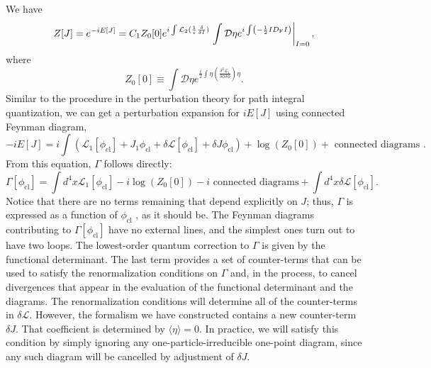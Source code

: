We have
\[Z[J] = e^{-iE[J]} =C_1 Z_0[0] e^{i\int \mathcal{L}_2(\frac{1}{i} \frac{\delta}{\delta I})} \left. \int \mathcal{D}\eta e^{i\int \left(-\frac{1}{2} I D_{\rm F} I \right)} \right|_{I=0},\]
where
\[Z_0[0] \equiv \int \mathcal{D}\eta e^{ \frac{i}{2}\int \eta \left( \frac{\delta^2 \mathcal{L}_1}{\delta \phi \delta \phi}\right) \eta }.\]
Similar to the procedure in the perturbation theory for path integral quantization, we can get a perturbation expansion for $iE[J]$ using connected Feynman diagram,
\[-iE[J] = i \int ( \mathcal{L}_1 [\phi_{\mathrm{cl}}] + J_1\phi_{\mathrm{cl}} + \delta \mathcal{L}[\phi_{\mathrm{cl}}] + \delta J \phi_{\mathrm{cl}} ) + \log(Z_0[0]) + \mbox{ connected diagrams }.\]
From this equation, $\Gamma$ follows directly:
\[\Gamma[\phi_{\mathrm{cl}}] = \int d^4x \mathcal{L}_1[\phi_{\mathrm{cl}}] -i\log(Z_0[0]) -i \mbox{ connected diagrams} + \int d^4x \delta\mathcal{L}[\phi_{\mathrm{cl}}].\]
Notice that there are no terms remaining that depend explicitly on $J$; thus, $\Gamma$ is expressed as a function of $\phi_{\mathrm{cl}}$ , as it should be. The Feynman diagrams contributing to $\Gamma[\phi_{\mathrm{cl}}]$ have no external lines, and the simplest ones turn out to have two loops. The lowest-order quantum correction to $\Gamma$ is given by the
functional determinant.
The last term provides a set of counter-terms that can be used to satisfy the renormalization conditions on $\Gamma$ and, in the process, to cancel divergences that appear in the evaluation of the functional determinant and the diagrams. 
The renormalization conditions will determine all of the counter-terms in $\delta \mathcal{L}$. However, the formalism we have constructed contains a new counter-term $\delta J$. That coefficient is determined by  $\langle \eta \rangle = 0$. In practice, we will satisfy this condition by simply ignoring any one-particle-irreducible one-point diagram, since any such diagram will be cancelled by adjustment of $\delta J$.

